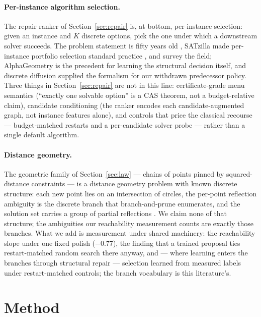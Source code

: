 \documentclass[11pt]{article}
\begin{document}
\paragraph{Per-instance algorithm selection.}
The repair ranker of Section~\ref{sec:repair} is, at bottom, per-instance selection: given an
instance and $K$ discrete options, pick the one under which a downstream solver succeeds. The
problem statement is fifty years old \citep{rice1976algorithm}, SATzilla made per-instance
portfolio selection standard practice \citep{xu2008satzilla}, and \citet{kerschke2019survey}
survey the field; AlphaGeometry \citep{trinh2024alphageometry} is the precedent for learning
the structural decision itself, and discrete diffusion \citep{austin2021d3pm,
vignac2023digress} supplied the formalism for our withdrawn predecessor policy. Three things
in Section~\ref{sec:repair} are not in this line: certificate-grade menu semantics (``exactly
one solvable option'' is a CAS theorem, not a budget-relative claim), candidate conditioning
(the ranker encodes each candidate-augmented graph, not instance features alone), and
controls that price the classical recourse --- budget-matched restarts and a per-candidate
solver probe --- rather than a single default algorithm.

\paragraph{Distance geometry.}
The geometric family of Section~\ref{sec:law} --- chains of points pinned by squared-distance
constraints --- is a distance geometry problem with known discrete structure: each new point
lies on an intersection of circles, the per-point reflection ambiguity is the discrete branch
that branch-and-prune enumerates, and the solution set carries a group of partial reflections
\citep{lavor2012dmdgp, liberti2014distance}. We claim none of that structure; the ambiguities
our reachability measurement counts are exactly those branches. What we add is measurement
under shared machinery: the reachability slope under one fixed polish ($-0.77$), the finding
that a trained proposal ties restart-matched random search there anyway, and --- where
learning enters the branches through structural repair --- selection learned from measured
labels under restart-matched controls; the branch vocabulary is this literature's.

\section{Method}
\label{sec:method}
\end{document}
